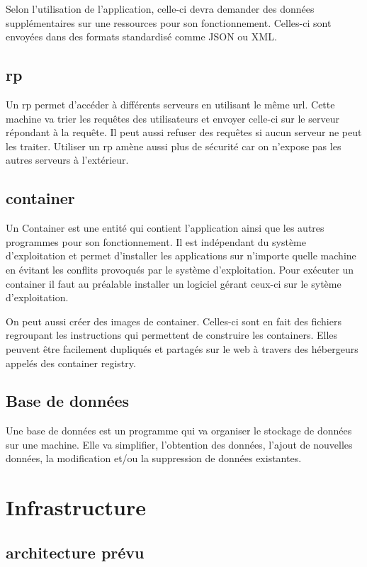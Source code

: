 \documentclass[
    iai, %
    il, %
]{heig-tb}
\begin{document}
Selon l'utilisation de l'application, celle-ci devra demander des données supplémentaires sur une ressources pour son fonctionnement.
Celles-ci sont envoyées dans des formats standardisé comme JSON ou XML.

\subsection{\Gls{rp}}
Un \gls{rp} permet d'accéder à différents serveurs en utilisant le même url.
Cette machine va trier les requêtes des utilisateurs
et envoyer celle-ci sur le serveur répondant à la requête.
Il peut aussi refuser des requêtes si aucun serveur ne peut les traiter.
Utiliser un \gls{rp} amène aussi plus de sécurité car on n'expose pas les autres serveurs à l'extérieur.

\subsection{\Gls{container}}
Un Container est une entité qui contient l'application ainsi que les autres programmes pour son fonctionnement.
Il est indépendant du système d'exploitation et permet d'installer les applications sur n'importe quelle machine en évitant les conflits provoqués par le système d'exploitation.
Pour exécuter un container il faut au préalable installer un logiciel gérant ceux-ci sur le sytème d'exploitation.

On peut aussi créer des images de container. Celles-ci sont en fait des fichiers regroupant les instructions qui permettent de construire les containers.
Elles peuvent être facilement dupliqués et partagés sur le web à travers des hébergeurs appelés des container registry.

\subsection{Base de données}
Une base de données est un programme qui va organiser le stockage de données sur une machine.
Elle va simplifier, l'obtention des données, l'ajout de nouvelles données, la modification et/ou la suppression de données existantes.

\section{Infrastructure}

\subsection{architecture prévu}
\end{document}
